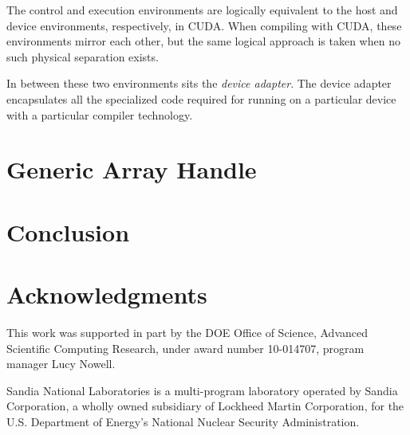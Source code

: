 \documentclass{sig-alternate}
\newcommand*{\keyterm}[1]{\emph{#1}}
\begin{document}
The control and execution environments are logically equivalent to the host
and device environments, respectively, in CUDA.  When compiling with CUDA,
these environments mirror each other, but the same logical approach is
taken when no such physical separation exists.

In between these two environments sits the \keyterm{device adapter}.  The
device adapter encapsulates all the specialized code required for running
on a particular device with a particular compiler technology.

\section{Generic Array Handle}
\label{sec:GenericArrayHandle}

\noindent

\section{Conclusion}
\label{sec:Conclusion}

\noindent

\section{Acknowledgments}

\noindent
This work was supported in part by the DOE Office of Science, Advanced
Scientific Computing Research, under award number 10-014707, program
manager Lucy Nowell.

Sandia National Laboratories is a multi-program laboratory operated by
Sandia Corporation, a wholly owned subsidiary of Lockheed Martin
Corporation, for the U.S. Department of Energy's National Nuclear Security
Administration.



\end{document}
